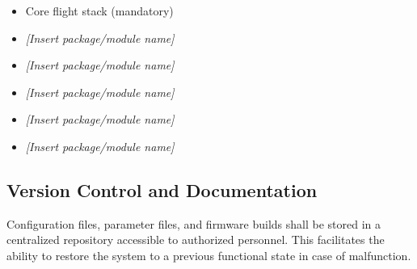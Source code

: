         \begin{itemize}
            \item [ ] Core flight stack (mandatory)
            \item [ ] \textit{[Insert package/module name]}
            \item [ ] \textit{[Insert package/module name]}
            \item [ ] \textit{[Insert package/module name]}
            \item [ ] \textit{[Insert package/module name]}
            \item [ ] \textit{[Insert package/module name]}
        \end{itemize}
        
        \subsection{Version Control and Documentation} Configuration files, parameter files, and firmware builds shall be stored in a centralized repository accessible to authorized personnel. This facilitates the ability to restore the system to a previous functional state in case of malfunction.
    
